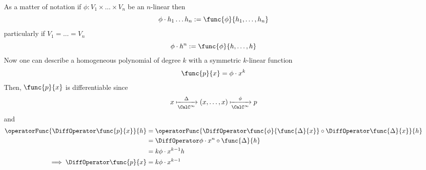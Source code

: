 As a matter of notation if \(\phi : V_1 \times \dots \times V_n\) be an \(n\)-linear then
\begin{equation*}
    \phi \cdot h_1\dots h_n := \func{\phi}{h_1, \dots , h_n}
\end{equation*}
particularly if \(V_1 = \dots = V_n\)
\begin{equation*}
    \phi \cdot h^n := \func{\phi}{h, \dots , h}
\end{equation*}
Now one can describe a homogeneous polynomial of degree \(k\) with a symmetric \(k\)-linear function
\begin{align*}
    \func{p}{x} = \phi \cdot x^k
\end{align*}
Then, \(\func{p}{x}\) is differentiable since
\begin{equation*}
    x \xmapsto[\CalC^\infty]{\Delta} (x,\dots,x) \xmapsto[\CalC^\infty]{\phi} p
\end{equation*}
and
\begin{align*}
    \operatorFunc{\DiffOperator \func{p}{x}}{h} & = \operatorFunc{\DiffOperator \func{\phi}{\func{\Delta}{x}} \circ \DiffOperator \func{\Delta}{x}}{h} \\
                                                & = \DiffOperator \phi \cdot x^n \circ \func{\Delta}{h}                                                \\
                                                & = k \phi \cdot x^{k-1}h                                                                              \\
    \implies \DiffOperator \func{p}{x}          & = k \phi \cdot x^{k-1}
\end{align*}

